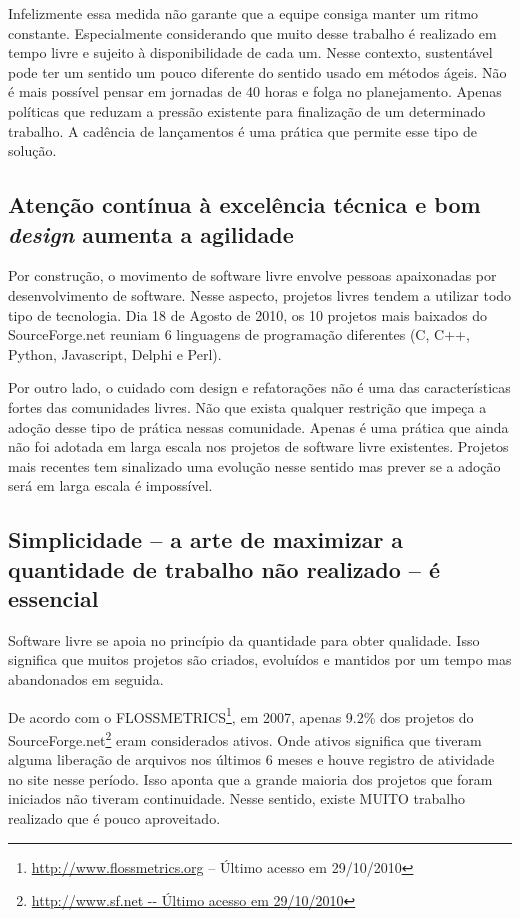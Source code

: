 Infelizmente essa medida não garante que a equipe consiga manter um
ritmo constante. Especialmente considerando que muito desse trabalho é
realizado em tempo livre e sujeito à disponibilidade de cada um. Nesse
contexto, sustentável pode ter um sentido um pouco diferente do
sentido usado em métodos ágeis. Não é mais possível pensar em jornadas
de 40 horas e folga no planejamento. Apenas políticas que reduzam a
pressão existente para finalização de um determinado trabalho. A
cadência de lançamentos é uma prática que permite esse tipo de
solução.

\subsection[Excelência técnica]{Atenção contínua à excelência técnica
  e bom \textit{design} aumenta a agilidade}

Por construção, o movimento de software livre envolve pessoas
apaixonadas por desenvolvimento de software. Nesse aspecto, projetos
livres tendem a utilizar todo tipo de tecnologia.  Dia 18 de Agosto de
2010, os 10 projetos mais baixados do SourceForge.net reuniam 6
linguagens de programação diferentes (C, C++, Python, Javascript,
Delphi e Perl).

Por outro lado, o cuidado com design e refatorações não é uma das
características fortes das comunidades livres. Não que exista qualquer
restrição que impeça a adoção desse tipo de prática nessas
comunidade. Apenas é uma prática que ainda não foi adotada em larga
escala nos projetos de software livre existentes. Projetos mais
recentes tem sinalizado uma evolução nesse sentido mas prever se a
adoção será em larga escala é impossível.


\subsection[Simplicidade é essencial]{Simplicidade -- a arte de
  maximizar a quantidade de trabalho não realizado -- é essencial}

Software livre se apoia no princípio da quantidade para obter
qualidade. Isso significa que muitos projetos são criados, evoluídos e
mantidos por um tempo mas abandonados em seguida.

De acordo com o
FLOSSMETRICS\footnote{\url{http://www.flossmetrics.org} -- Último
  acesso em 29/10/2010}, em 2007, apenas 9.2\% dos projetos do
SourceForge.net\footnote{\url{http://www.sf.net -- Último acesso em
    29/10/2010}} eram considerados ativos. Onde ativos significa que
tiveram alguma liberação de arquivos nos últimos 6 meses e houve
registro de atividade no site nesse período. Isso aponta que a grande
maioria dos projetos que foram iniciados não tiveram
continuidade. Nesse sentido, existe MUITO trabalho realizado que é
pouco aproveitado.

